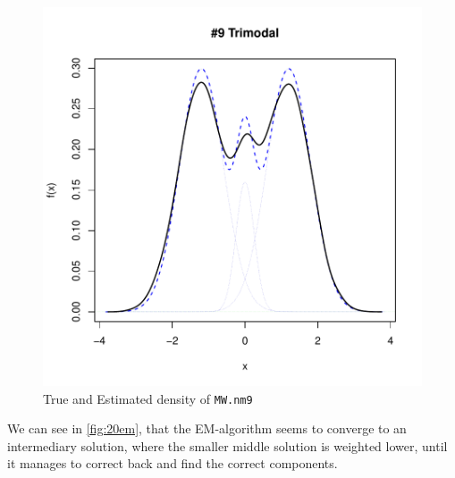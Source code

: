 \begin{figure}[h]
    \begin{Rgraph}[0.9]
\includegraphics{chapter1-figTrimodal}
    \caption{True and Estimated density of {\tt MW.nm9}}
    \label{fig:MW.nm9}
    \end{Rgraph}
\end{figure}

We can see in \ref{fig:20em}, that the EM-algorithm seems to converge to an 
intermediary solution, where the smaller middle solution is weighted lower, 
until it manages to correct back and find the correct components.



